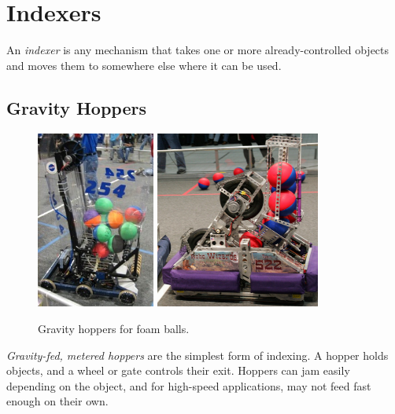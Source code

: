 \section{Indexers}
An \textit{indexer} is any mechanism that takes one or more already-controlled objects and moves them to somewhere else where it can be used.
\subsection{Gravity Hoppers}
\begin{figure}[H]
	\includegraphics[height=2.3in]{imgs/hopper_gravity_1.jpeg}
	\includegraphics[height=2.3in]{imgs/hopper_gravity_2.png}
	\caption{Gravity hoppers for foam balls.}
\end{figure}
\textit{Gravity-fed, metered hoppers} are the simplest form of indexing. A hopper holds objects, and a wheel or gate controls their exit. Hoppers can jam easily depending on the object, and for high-speed applications, may not feed fast enough on their own.
